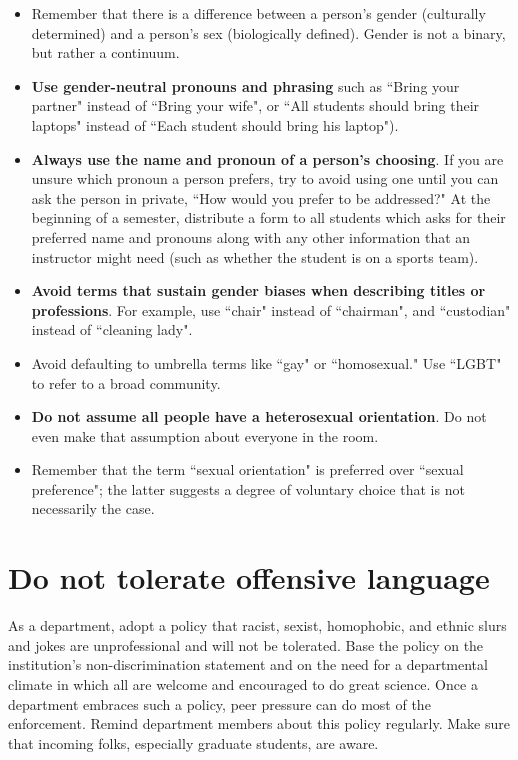 \begin{itemize}
	\item Remember that there is a difference between a person's gender (culturally determined) and a person's sex (biologically defined). Gender is not a binary, but rather a continuum.
	\item \textbf{Use gender-neutral pronouns and phrasing} such as ``Bring your partner" instead of ``Bring your wife", or ``All students should bring their laptops" instead of ``Each student should bring his laptop").
	\item \textbf{Always use the name and pronoun of a person's choosing}. If you are unsure which pronoun a person prefers, try to avoid using one until you can ask the person in private, ``How would you prefer to be addressed?" At the beginning of a semester, distribute a form to all students which asks for their preferred name and pronouns along with any other information that an instructor might need (such as whether the student is on a sports team).
	\item \textbf{Avoid terms that sustain gender biases when describing titles or professions}. For example, use ``chair" instead of ``chairman", and ``custodian" instead of ``cleaning lady".
	\item Avoid defaulting to umbrella terms like ``gay" or ``homosexual." Use ``LGBT" to refer to a broad community.
	\item \textbf{Do not assume all people have a heterosexual orientation}.  Do not even make that assumption about everyone in the room.
	\item Remember that the term ``sexual orientation" is preferred over ``sexual preference"; the latter suggests a degree of voluntary choice that is not necessarily the case.
\end{itemize}


\section {Do not tolerate offensive language}
\label{offensive-language}
As a department, adopt a policy that racist, sexist, homophobic, and ethnic slurs and jokes are unprofessional and will not be tolerated.  Base the policy on the institution's non-discrimination statement and on the need for a departmental climate in which all are welcome and encouraged to do great science.  Once a department embraces such a policy, peer pressure can do most of the enforcement.  Remind department members about this policy regularly.  Make sure that incoming folks, especially graduate students, are aware.

